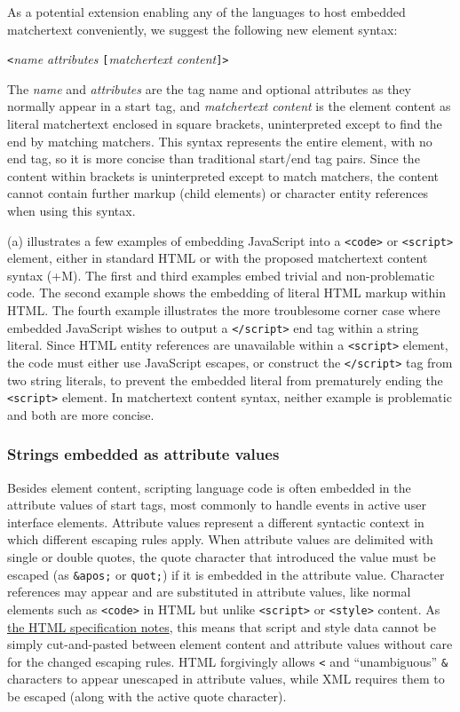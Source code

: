 As a potential extension enabling any of the \ml languages
to host embedded matchertext conveniently,
we suggest the following new element syntax:

\begin{center}
\verb|<|\emph{name attributes }\verb|[|\emph{matchertext content}\verb|]>|
\end{center}

The \emph{name} and \emph{attributes} are the tag name and optional attributes
as they normally appear in a start tag,
and \emph{matchertext content} is the element content as literal matchertext
enclosed in square brackets,
uninterpreted except to find the end by matching matchers.
This syntax represents the entire element,
with no end tag,
so it is more concise than traditional start/end tag pairs.
Since the content within brackets is uninterpreted except to match matchers,
the content cannot contain further markup (child elements)
or \ml character entity references when using this syntax.

(a) illustrates a few examples
of embedding JavaScript into a \verb|<code>| or \verb|<script>| element,
either in standard HTML or with the proposed matchertext content syntax (+M).
The first and third examples embed trivial and non-problematic code.
The second example shows the embedding of literal HTML markup within HTML.
The fourth example illustrates the more troublesome corner case
where embedded JavaScript wishes to output
a \verb|</script>| end tag within a string literal.
Since HTML entity references are unavailable within a \verb|<script>| element,
the code must either use JavaScript escapes,
or construct the \verb|</script>| tag from two string literals,
to prevent the embedded literal from prematurely ending
the \verb|<script>| element.
In matchertext content syntax,
neither example is problematic and both are more concise.


\subsubsection{Strings embedded as attribute values}

Besides element content,
scripting language code is often embedded in the attribute values
of \ml start tags,
most commonly to handle events in active user interface elements.
Attribute values represent a different syntactic context
in which different escaping rules apply.
When attribute values are delimited with single or double quotes,
the quote character that introduced the value must be escaped
(as \verb|&apos;| or \verb|quot;|)
if it is embedded in the attribute value.
Character references may appear and are substituted in attribute values,
like normal elements such as \verb|<code>| in HTML
but unlike \verb|<script>| or \verb|<style>| content.
As \href{https://www.w3.org/TR/html401/appendix/notes.html#notes-specifying-data}{the HTML specification notes},
this means that script and style data cannot be simply
cut-and-pasted between element content and attribute values
without care for the changed escaping rules.
HTML forgivingly allows \verb|<| and ``unambiguous'' \verb|&| characters
to appear unescaped in attribute values,
while XML requires them to be escaped (along with the active quote character).

